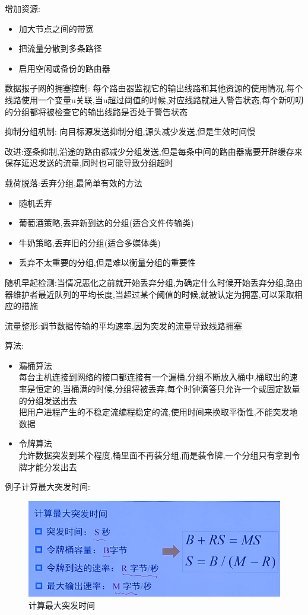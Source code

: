 \documentclass[UTF8,a4paper]{ctexart}
\begin{document}
增加资源:
\begin{itemize}
  \item 加大节点之间的带宽
  \item 把流量分散到多条路径
  \item 启用空闲或备份的路由器
\end{itemize}

数据报子网的拥塞控制:
每个路由器监视它的输出线路和其他资源的使用情况,每个线路使用一个变量u关联,当u超过阈值的时候,对应线路就进入警告状态,每个新叨叨的分组都将被检查它的输出线路是否处于警告状态

抑制分组机制:
向目标源发送抑制分组,源头减少发送,但是生效时间慢

改进:逐条抑制,沿途的路由都减少分组发送,但是每条中间的路由器需要开辟缓存来保存延迟发送的流量,同时也可能导致分组超时

载荷脱落:丢弃分组,最简单有效的方法
\begin{itemize}
  \item 随机丢弃
  \item 葡萄酒策略,丢弃新到达的分组(适合文件传输类)
  \item 牛奶策略,丢弃旧的分组(适合多媒体类)
  \item 丢弃不太重要的分组,但是难以衡量分组的重要性
\end{itemize}

随机早起检测:当情况恶化之前就开始丢弃分组,为确定什么时候开始丢弃分组,路由器维护者最近队列的平均长度,当超过某个阈值的时候,就被认定为拥塞,可以采取相应的措施

流量整形:调节数据传输的平均速率,因为突发的流量导致线路拥塞

算法:
\begin{itemize}
  \item 漏桶算法\\
  每台主机连接到网络的接口都连接有一个漏桶,分组不断放入桶中,桶取出的速率是恒定的,当桶满的时候,分组将被丢弃,每个时钟滴答只允许一个或固定数量的分组发送出去\\
  把用户进程产生的不稳定流编程稳定的流,使用时间来换取平衡性,不能突发地数据
  \item 令牌算法\\
  允许数据突发到某个程度,桶里面不再装分组,而是装令牌,一个分组只有拿到令牌才能分发出去
\end{itemize}

例子计算最大突发时间:
\begin{figure}[H]
  \centering
  \includegraphics{assets/jisuanjiwangluo_dce07.png}
  \caption{计算最大突发时间}
\end{figure}
\end{document}

